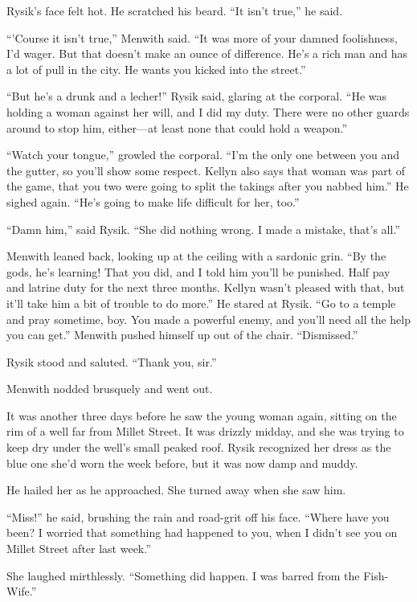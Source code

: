 \documentclass[10pt,b5paper]{article}
\begin{document}
Rysik's face felt hot. He scratched his beard. ``It isn't true,''
he said.

``'Course it isn't true,'' Menwith said. ``It was more of your damned
foolishness, I'd wager. But that doesn't make an ounce of difference.
He's a rich man and has a lot of pull in the city. He wants you
kicked into the street.''

``But he's a drunk and a lecher!'' Rysik said, glaring at the
corporal. ``He was holding a woman against her will, and I did my
duty. There were no other guards around to stop him, either---at
least none that could hold a weapon.''

``Watch your tongue,'' growled the corporal. ``I'm the only one between
you and the gutter, so you'll show some respect. Kellyn also says
that woman was part of the game, that you two were going to split
the takings after you nabbed him.'' He sighed again. ``He's going to
make life difficult for her, too.''

``Damn him,'' said Rysik. ``She did nothing wrong. I made a mistake,
that's all.''

Menwith leaned back, looking up at the ceiling with a sardonic grin.
``By the gods, he's learning! That you did, and I told him you'll be
punished. Half pay and latrine duty for the next three months. Kellyn
wasn't pleased with that, but it'll take him a bit of trouble to
do more.'' He stared at Rysik. ``Go to a temple and pray sometime,
boy. You made a powerful enemy, and you'll need all the help you
can get.'' Menwith pushed himself up out of the chair. ``Dismissed.''

Rysik stood and saluted. ``Thank you, sir.''

Menwith nodded brusquely and went out.

\bigskip

It was another three days before he saw the young woman again,
sitting on the rim of a well far from Millet Street. It was drizzly
midday, and she was trying to keep dry under the well's small peaked
roof. Rysik recognized her dress as the blue one she'd worn the
week before, but it was now damp and muddy.

He hailed her as he approached. She turned away when she saw him.

``Miss!'' he said, brushing the rain and road-grit off his face. ``Where
have you been? I worried that something had happened to you, when
I didn't see you on Millet Street after last week.''

She laughed mirthlessly. ``Something did happen. I was barred from
the Fish-Wife.''
\end{document}
